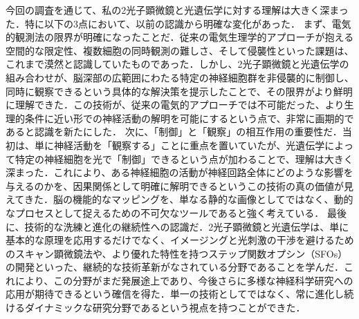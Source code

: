 \documentclass{classes/report}
\begin{document}
今回の調査を通じて、私の2光子顕微鏡と光遺伝学に対する理解は大きく深まった．特に以下の3点において、以前の認識から明確な変化があった．
まず、電気的観測法の限界が明確になったことだ．従来の電気生理学的アプローチが抱える空間的な限定性、複数細胞の同時観測の難しさ、そして侵襲性といった課題は、これまで漠然と認識していたものであった．しかし、2光子顕微鏡と光遺伝学の組み合わせが、脳深部の広範囲にわたる特定の神経細胞群を非侵襲的に制御し、同時に観察できるという具体的な解決策を提示したことで、その限界がより鮮明に理解できた．この技術が、従来の電気的アプローチでは不可能だった、より生理的条件に近い形での神経活動の解明を可能にするという点で、非常に画期的であると認識を新たにした．
次に、「制御」と「観察」の相互作用の重要性だ．当初は、単に神経活動を「観察する」ことに重点を置いていたが、光遺伝学によって特定の神経細胞を光で「制御」できるという点が加わることで、理解は大きく深まった．これにより、ある神経細胞の活動が神経回路全体にどのような影響を与えるのかを、因果関係として明確に解明できるというこの技術の真の価値が見えてきた．脳の機能的なマッピングを、単なる静的な画像としてではなく、動的なプロセスとして捉えるための不可欠なツールであると強く考えている．
最後に、技術的な洗練と進化の継続性への認識だ．2光子顕微鏡と光遺伝学は、単に基本的な原理を応用するだけでなく、イメージングと光刺激の干渉を避けるためのスキャン顕微鏡法や、より優れた特性を持つステップ関数オプシン（SFOs）の開発といった、継続的な技術革新がなされている分野であることを学んだ．これにより、この分野がまだ発展途上であり、今後さらに多様な神経科学研究への応用が期待できるという確信を得た．単一の技術としてではなく、常に進化し続けるダイナミックな研究分野であるという視点を持つことができた．
\end{document}
